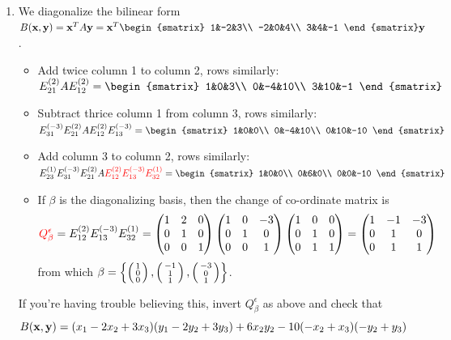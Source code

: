 \begin{examples}{}{}
\begin{enumerate}
		
	  \item We diagonalize the bilinear form $B(\vx,\vy)=\vx^TA\vy=\vx^T
		\begin{smatrix}
			1&-2&3\\
			-2&0&4\\
			3&4&-1
		\end{smatrix}
		\vy$.
		\begin{itemize}
		  \item Add twice column 1 to column 2, rows similarly: $E_{21}^{(2)}AE_{12}^{(2)}=
			\begin{smatrix}
				1&0&3\\
				0&-4&10\\
				3&10&-1
			\end{smatrix}$
			\item Subtract thrice column 1 from column 3, rows similarly: $E_{31}^{(-3)}E_{21}^{(2)}AE_{12}^{(2)}E_{13}^{(-3)}=
			\begin{smatrix}
				1&0&0\\
				0&-4&10\\
				0&10&-10
			\end{smatrix}$
			\item Add column 3 to column 2, rows similarly: $E_{23}^{(1)}E_{31}^{(-3)}E_{21}^{(2)}A
			\textcolor{red}{E_{12}^{(2)}E_{13}^{(-3)}E_{32}^{(1)}}=
			\begin{smatrix}
				1&0&0\\
				0&6&0\\
				0&0&-10
			\end{smatrix}$
			\item If $\beta$ is the diagonalizing basis, then the change of co-ordinate matrix is
			\[
				\textcolor{red}{Q_\beta^\epsilon}
				=
				E_{12}^{(2)}E_{13}^{(-3)}E_{32}^{(1)}
				=\begin{pmatrix}
					1&2&0\\
					0&1&0\\
					0&0&1
				\end{pmatrix}
				\begin{pmatrix}
					1&0&-3\\
					0&1&0\\
					0&0&1
				\end{pmatrix}
				\begin{pmatrix}
					1&0&0\\
					0&1&0\\
					0&1&1
				\end{pmatrix}
				=\begin{pmatrix}
					1&-1&-3\\
					0&1&0\\
					0&1&1
				\end{pmatrix}
			\]
			from which $\beta=\left\{\left(\begin{smallmatrix}1\\0\\0\end{smallmatrix}\right),\left(\begin{smallmatrix}-1\\1\\1\end{smallmatrix}\right),\left(\begin{smallmatrix}-3\\0\\1\end{smallmatrix}\right)\right\}$. 
		\end{itemize}
		If you're having trouble believing this, invert $Q_\beta^\epsilon$ as above and check that
		\[
			B({\mathbf{x}},{\mathbf{y}})=(x_1-2x_2+3x_3)(y_1-2y_2+3y_3)+6x_2y_2-10(-x_2+x_3)(-y_2+y_3)
		\]\vspace{-5pt}
	\end{enumerate}
\end{examples}


